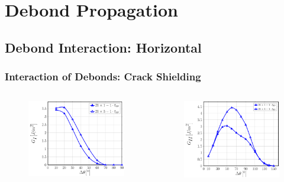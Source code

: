 \documentclass[first,firstsupp,lastsupp,last,hyperref,table]{ETHclass}
\begin{document}
\section{Debond Propagation}

\subsection{Debond Interaction: Horizontal}

\begin{frame}
\frametitle{\vspace{0.2cm}\small Interaction of Debonds: Crack Shielding}
\vspace{-.75cm}
\centering
\begin{columns}[c]
\centering
\begin{column}{0.5\textwidth}
\centering
\begin{figure}
\centering
\includegraphics[width=\columnwidth]{nxk-1-vf60-GI-crackshield21.pdf}
\end{figure}
\end{column}
\begin{column}{0.5\textwidth}
\centering
\begin{figure}
\centering
\includegraphics[width=\columnwidth]{nxk-1-vf60-GII-crackshield21.pdf}

\end{figure}
\end{column}
\end{columns}
\end{frame}
\end{document}

